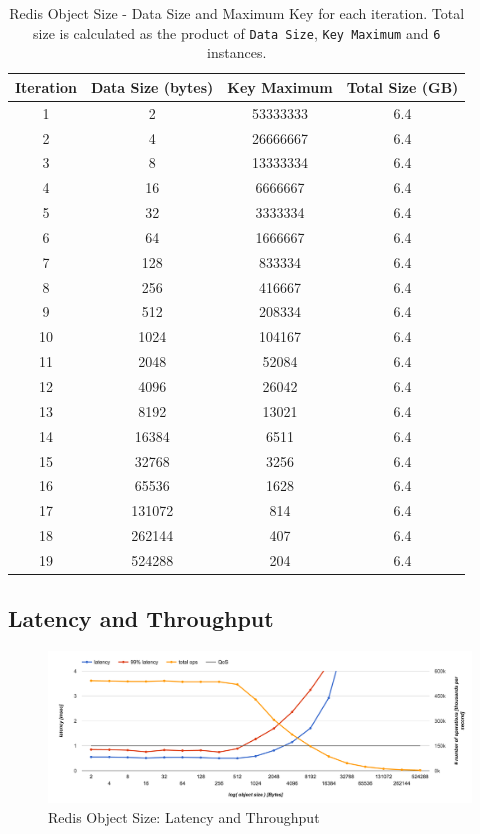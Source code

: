 \begin{table}[h!]
\centering
 \begin{tabular}{| c || c c c |}
 \hline
 Iteration & Data Size (bytes) & Key Maximum & Total Size (GB) \\ [0.5ex]
 \hline\hline
    1 & 2 & 53333333 & 6.4 \\ \hline
    2 & 4 & 26666667 & 6.4 \\ \hline
    3 & 8 & 13333334 & 6.4 \\ \hline
    4 & 16 & 6666667 & 6.4 \\ \hline
    5 & 32 & 3333334 & 6.4 \\ \hline
    6 & 64 & 1666667 & 6.4 \\ \hline
    7 & 128 & 833334 & 6.4 \\ \hline
    8 & 256 & 416667 & 6.4 \\ \hline
    9 & 512 & 208334 & 6.4 \\ \hline
    10 & 1024 & 104167 & 6.4 \\ \hline
    11 & 2048 & 52084 & 6.4 \\ \hline
    12 & 4096 & 26042 & 6.4 \\ \hline
    13 & 8192 & 13021 & 6.4 \\ \hline
    14 & 16384 & 6511 & 6.4 \\ \hline
    15 & 32768 & 3256 & 6.4 \\ \hline
    16 & 65536 & 1628 & 6.4 \\ \hline
    17 & 131072 & 814 & 6.4 \\ \hline
    18 & 262144 & 407 & 6.4 \\ \hline
    19 & 524288 & 204 & 6.4 \\ \hline
\end{tabular}
\caption{Redis Object Size - Data Size and Maximum Key for each iteration. Total size is calculated as the product of \texttt{Data Size}, \texttt{Key Maximum} and \texttt{6} instances.}
\label{tab:6:object_size_latency}
\end{table}


\subsection{Latency and Throughput}

\begin{figure}[h]
    \includegraphics[width=\textwidth]{./res/6_object_size_latency_ops.png}
    \caption{Redis Object Size: Latency and Throughput}
    \label{fig:6_object_size_latency_ops.png}
\end{figure}


